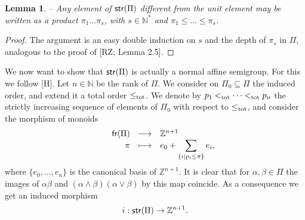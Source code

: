 \documentclass[twoside,11pt]{article}
\newcommand{\join}{\vee}
\newcommand{\meet}{\wedge}
\newcommand{\N}{{\mathbb N}}
\newcommand{\Z}{{\mathbb Z}}
\newcommand{\tot}{{\rm tot}}
\newcommand{\FrMon}{{\sf fr}}
\newcommand{\StMon}{{\sf str}}
\newtheorem{sublemma}[subtheorem]{Lemma}
\begin{document}
\begin{sublemma} -- \label{formal-monomial-basis}
Any element of $\StMon(\Pi)$ different from the unit element may be written as a product 
$\pi_1 \dots \pi_s$, with $s\in\N^*$ and $\pi_1 \le \dots \le \pi_s$.
\end{sublemma}

\begin{proof} The argument is an easy double induction on $s$ and the depth of $\pi_s$ in
$\Pi$, analogous to the proof of [RZ; Lemma 2.5]. \end{proof}

We now want to show that $\StMon(\Pi)$ is actually a normal affine semigroup. For this we
follow [H]. Let $n \in\N$ be the rank of $\Pi$. We consider on $\Pi_0 \subseteq \Pi$ the
induced order, and extend it a total order $\le_\tot$. We denote by $p_1 <_\tot \dots
<_\tot p_n$ the strictly increasing sequence of elements of $\Pi_0$ with respect to
$\le_\tot$, and consider the morphism of monoids
\[
\begin{array}{ccrcl}
 & & \FrMon(\Pi) & \longrightarrow & \Z^{n+1} \cr
	& & \pi &\longmapsto &\displaystyle e_0 + \sum_{\{i \mid p_i\le\pi\} } e_i,
\end{array}
\]
where $\{e_0,\dots,e_n\}$ is the canonical basis of $\Z^{n+1}$. It is clear that for
$\alpha,\beta\in\Pi$ the images of $\alpha\beta$ and
$(\alpha\meet\beta)(\alpha\join\beta)$ by this map coincide. As a consequence we get
an induced morphism \[i: \StMon(\Pi) \to \Z^{n+1}.\]
\end{document}
